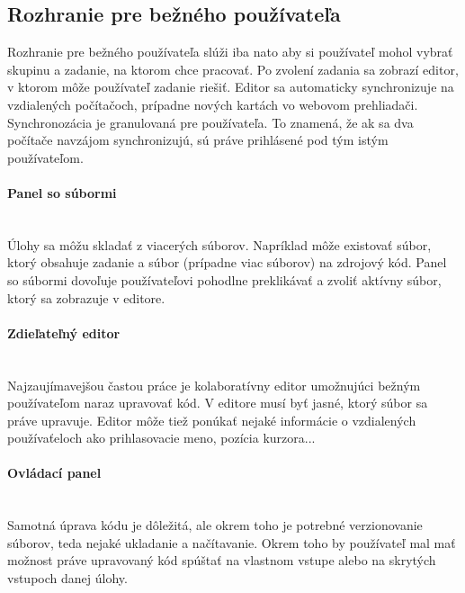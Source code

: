 \subsection{Rozhranie pre bežného používateľa}
Rozhranie pre bežného používateľa slúži iba nato aby si používateľ mohol vybrať skupinu a zadanie,
na ktorom chce pracovať. Po zvolení zadania sa zobrazí editor, v ktorom môže používateľ zadanie
riešiť. Editor sa automaticky synchronizuje na vzdialených počítačoch, prípadne nových kartách 
vo webovom prehliadači. Synchronozácia je granulovaná pre používateľa. To znamená, že ak sa dva
počítače navzájom synchronizujú, sú práve prihlásené pod tým istým používateľom.

\paragraph{Panel so súbormi}\leavevmode\\
Úlohy sa môžu skladať z viacerých súborov. Napríklad môže existovať súbor, ktorý
obsahuje zadanie a súbor (prípadne viac súborov) na zdrojový kód. Panel so súbormi dovoľuje
používateľovi pohodlne preklikávať a zvoliť aktívny súbor, ktorý sa zobrazuje v editore.

\paragraph{Zdieľateľný editor}\leavevmode\\
Najzaujímavejšou častou práce je kolaboratívny editor umožnujúci bežným používateľom naraz upravovať
kód. V editore musí byť jasné, ktorý súbor sa práve upravuje. Editor môže tiež ponúkať nejaké
informácie o vzdialených používaťeloch ako prihlasovacie meno, pozícia kurzora...

\paragraph{Ovládací panel}\leavevmode\\
Samotná úprava kódu je dôležitá, ale okrem toho je potrebné verzionovanie
súborov, teda nejaké ukladanie a načítavanie. Okrem toho by používateľ mal mať možnost práve
upravovaný kód spúštať na vlastnom vstupe alebo na skrytých vstupoch danej úlohy.


